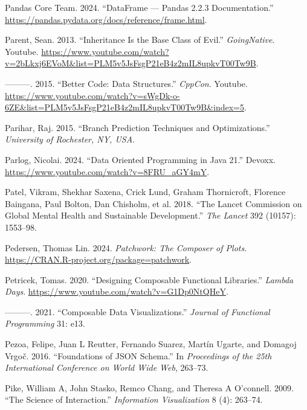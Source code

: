 \documentclass[
]{book}
\newlength{\cslhangindent}
\newenvironment{CSLReferences}[2] %
 {\begin{list}{}{%
  \setlength{\itemindent}{0pt}
  \setlength{\leftmargin}{0pt}
  \setlength{\parsep}{0pt}
  \ifodd #1
   \setlength{\leftmargin}{\cslhangindent}
   \setlength{\itemindent}{-1\cslhangindent}
  \fi
  \setlength{\itemsep}{#2\baselineskip}}}
 {\end{list}}
\theoremstyle{definition}
\theoremstyle{definition}
\theoremstyle{definition}
\theoremstyle{definition}
\theoremstyle{remark}
\begin{document}
\begin{CSLReferences}{1}{0}
Pandas Core Team. 2024. {``DataFrame {\ifmmode---\else\textemdash\fi} Pandas 2.2.3 Documentation.''} \url{https://pandas.pydata.org/docs/reference/frame.html}.

Parent, Sean. 2013. {``Inheritance Is the Base Class of Evil.''} \emph{GoingNative}. Youtube. \url{https://www.youtube.com/watch?v=2bLkxj6EVoM&list=PLM5v5JsFsgP21eB4z2mIL8upkvT00Tw9B}.

---------. 2015. {``Better Code: Data Structures.''} \emph{CppCon}. Youtube. \url{https://www.youtube.com/watch?v=sWgDk-o-6ZE&list=PLM5v5JsFsgP21eB4z2mIL8upkvT00Tw9B&index=5}.

Parihar, Raj. 2015. {``Branch Prediction Techniques and Optimizations.''} \emph{University of Rochester, NY, USA}.

Parlog, Nicolai. 2024. {``Data Oriented Programming in Java 21.''} Devoxx. \url{https://www.youtube.com/watch?v=8FRU_aGY4mY}.

Patel, Vikram, Shekhar Saxena, Crick Lund, Graham Thornicroft, Florence Baingana, Paul Bolton, Dan Chisholm, et al. 2018. {``The Lancet Commission on Global Mental Health and Sustainable Development.''} \emph{The Lancet} 392 (10157): 1553--98.

Pedersen, Thomas Lin. 2024. \emph{Patchwork: The Composer of Plots}. \url{https://CRAN.R-project.org/package=patchwork}.

Petricek, Tomas. 2020. {``Designing Composable Functional Libraries.''} \emph{Lambda Days}. \url{https://www.youtube.com/watch?v=G1Dp0NtQHeY}.

---------. 2021. {``Composable Data Visualizations.''} \emph{Journal of Functional Programming} 31: e13.

Pezoa, Felipe, Juan L Reutter, Fernando Suarez, Martín Ugarte, and Domagoj Vrgoč. 2016. {``Foundations of JSON Schema.''} In \emph{Proceedings of the 25th International Conference on World Wide Web}, 263--73.

Pike, William A, John Stasko, Remco Chang, and Theresa A O'connell. 2009. {``The Science of Interaction.''} \emph{Information Visualization} 8 (4): 263--74.


\end{CSLReferences}
\end{document}
